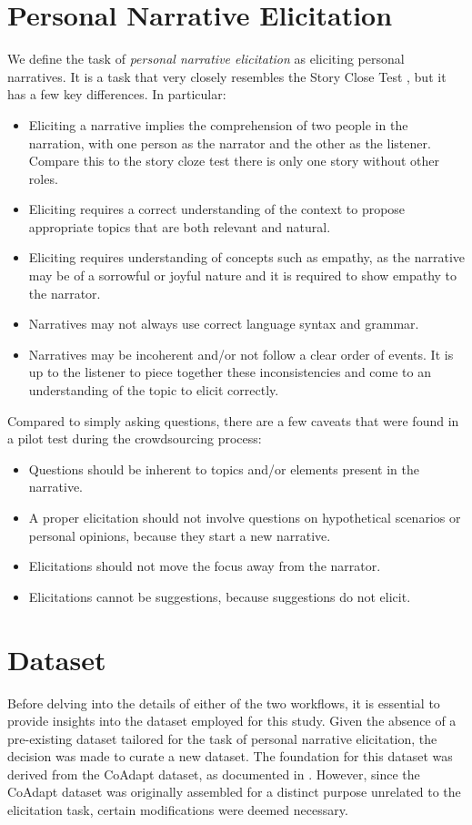 \section{Personal Narrative Elicitation}
We define the task of \emph{personal narrative elicitation} as eliciting personal narratives. It is a task that very closely resembles the Story Close Test \cite{mostafazadeh2016corpus}, but it has a few key differences. In particular:
\begin{itemize}
    \item  Eliciting a narrative implies the comprehension of two people in the narration, with one person as the narrator and the other as the listener. Compare this to the story cloze test there is only one story without other roles.
    \item  Eliciting requires a correct understanding of the context to propose appropriate topics that are both relevant and natural.
    \item Eliciting requires understanding of concepts such as empathy, as the narrative may be of a sorrowful or joyful nature and it is required to show empathy to the narrator.
    \item Narratives may not always use correct language syntax and grammar.
    \item Narratives may be incoherent and/or not follow a clear order of events. It is up to the listener to piece together these inconsistencies and come to an understanding of the topic to elicit correctly.
\end{itemize}
Compared to simply asking questions, there are a few caveats that were found in a pilot test during the crowdsourcing process:
\begin{itemize}
    \item Questions should be inherent to topics and/or elements present in the narrative.
    \item A proper elicitation should not involve questions on hypothetical scenarios or personal opinions, because they start a new narrative.
    \item Elicitations should not move the focus away from the narrator.
    \item Elicitations cannot be suggestions, because suggestions do not elicit.
\end{itemize}

\section{Dataset}
Before delving into the details of either of the two workflows, it is essential to provide insights into the dataset employed for this study. Given the absence of a pre-existing dataset tailored for the task of personal narrative elicitation, the decision was made to curate a new dataset. The foundation for this dataset was derived from the CoAdapt dataset, as documented in \cite{coadapt}. However, since the CoAdapt dataset was originally assembled for a distinct purpose unrelated to the elicitation task, certain modifications were deemed necessary.

